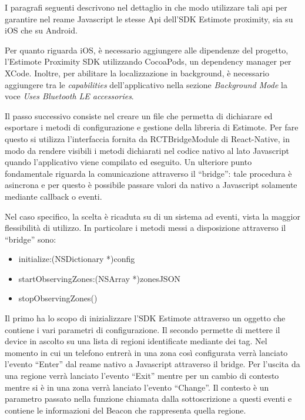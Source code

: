 I paragrafi seguenti descrivono nel dettaglio in che modo utilizzare tali api per garantire nel reame Javascript le stesse Api dell’SDK Estimote proximity, sia su iOS che su Android.\vspace{5mm}

Per quanto riguarda iOS, è necessario aggiungere alle dipendenze del progetto, l'Estimote Proximity SDK utilizzando CocoaPods, un dependency manager per XCode. Inoltre, per abilitare la localizzazione in background, è necessario aggiungere tra le \emph{capabilities} dell’applicativo nella sezione \emph{Background Mode} la voce \emph{Uses Bluetooth LE accessories}. \vspace{5mm}

Il passo successivo consiste nel creare un file che permetta di dichiarare ed esportare i metodi di configurazione e gestione della libreria di Estimote. Per fare questo si utilizza l’interfaccia fornita da RCTBridgeModule  di React-Native, in modo da rendere visibili i metodi dichiarati nel codice nativo al lato Javascript quando l'applicativo viene compilato ed eseguito. Un ulteriore punto fondamentale riguarda la comunicazione attraverso il “bridge”: tale procedura è asincrona e per questo è possibile passare valori da nativo a Javascript solamente mediante callback o eventi. \vspace{5mm}

Nel caso specifico, la scelta è ricaduta su di un sistema ad eventi, vista la maggior flessibilità di utilizzo. In particolare i metodi messi a disposizione attraverso il “bridge” sono:\vspace{5mm}

\begin{itemize}
	\item initialize:(NSDictionary *)config
	\item startObservingZones:(NSArray *)zonesJSON
	\item stopObservingZones()
\end{itemize}\vspace{5mm}
	
Il primo ha lo scopo di inizializzare l'SDK Estimote attraverso un oggetto che contiene i vari parametri di configurazione. Il secondo permette di mettere il device in ascolto su una lista di regioni identificate mediante dei tag. Nel momento in cui un telefono entrerà in una zona così configurata verrà lanciato l’evento “Enter” dal reame nativo a Javascript attraverso il bridge. Per l’uscita da una regione verrà lanciato l’evento “Exit” mentre per un cambio di contesto mentre si è in una zona verrà lanciato l'evento “Change”. Il contesto è un parametro passato nella funzione chiamata dalla sottoscrizione a questi eventi e contiene le informazioni del Beacon che rappresenta quella regione.\vspace{5mm}

